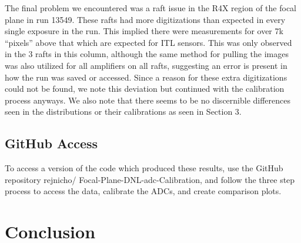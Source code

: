 \documentclass[11pt, letterpaper]{article}
\begin{document}
The final problem we encountered was a raft issue in the R4X region of the focal plane in run 13549. 
These rafts had more digitizations than expected in every single exposure in the run. 
This implied there were measurements for over 7k “pixels” above that which are expected for ITL sensors. 
This was only observed in the 3 rafts in this column, although the same method for pulling the images was also utilized for all amplifiers on all rafts, suggesting an error is present in how the run was saved or accessed. 
Since a reason for these extra digitizations could not be found, we note this deviation but continued with the calibration process anyways. 
We also note that there seems to be no discernible differences seen in the distributions or their calibrations as seen in Section 3. 

\subsection{GitHub Access}
\indent 


To access a version of the code which produced these results, use the GitHub repository rejnicho/
Focal-Plane-DNL-adc-Calibration, and follow the three step process to access the data, calibrate the ADCs, and create comparison plots. 

\section{Conclusion}
\indent
\end{document}
